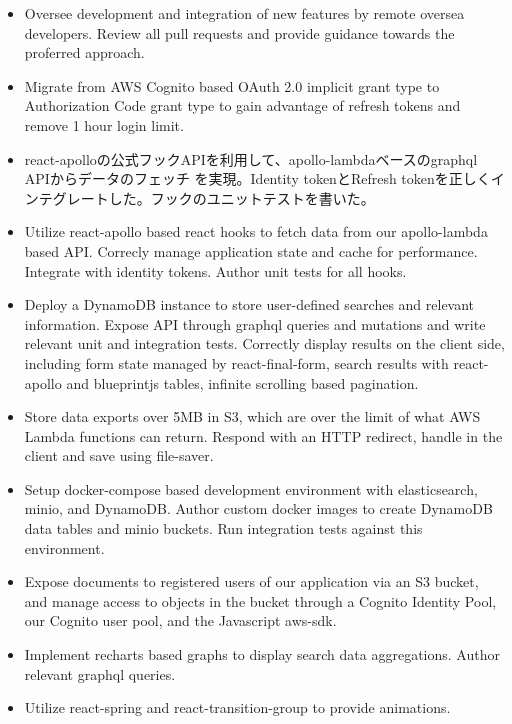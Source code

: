 \documentclass{res}
\begin{document}
\begin{resume}
\begin{position}
 \begin{itemize} \itemsep -2pt %
  \item Oversee development and integration of new features by remote oversea developers.
    Review all pull requests and provide guidance towards the proferred approach.
  \item Migrate from AWS Cognito based OAuth 2.0 implicit grant type to Authorization Code grant type
    to gain advantage of refresh tokens and remove 1 hour login limit.
  \item react-apolloの公式フックAPIを利用して、apollo-lambdaベースのgraphql APIからデータのフェッチ
    を実現。Identity tokenとRefresh tokenを正しくインテグレートした。フックのユニットテストを書いた。
  \item Utilize react-apollo based react hooks to fetch data from our apollo-lambda based API.
    Correcly manage application state and cache for performance. Integrate with identity tokens.
    Author unit tests for all hooks.
  \item Deploy a DynamoDB instance to store user-defined searches and relevant information.
    Expose API through graphql queries and mutations and write relevant unit and integration tests.
    Correctly display results on the client side, including form state managed by react-final-form,
    search results with react-apollo and blueprintjs tables, infinite scrolling based pagination.
  \item Store data exports over 5MB in S3, which are over the limit of what AWS Lambda
    functions can return. Respond with an HTTP redirect, handle in the client and save using file-saver.
  \item Setup docker-compose based development environment with elasticsearch, minio, and DynamoDB.
    Author custom docker images to create DynamoDB data tables and minio buckets. Run integration tests
    against this environment.
  \item Expose documents to registered users of our application via an S3 bucket, and manage access to objects
    in the bucket through a Cognito Identity Pool, our Cognito user pool, and the Javascript aws-sdk.
  \item Implement recharts based graphs to display search data aggregations. Author relevant graphql queries.
  \item Utilize react-spring and react-transition-group to provide animations.
 \end{itemize}
\end{position}


\end{resume}
\end{document}
